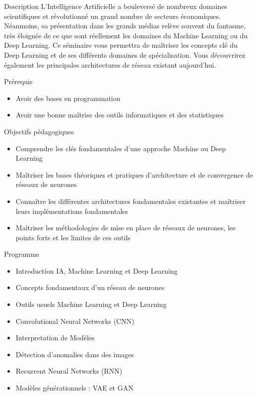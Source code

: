 
\begin{frame}{Description}
  L'Intelligence Artificielle a bouleversé de nombreux domaines scientifiques et révolutionné un grand nombre de secteurs économiques.
  Néanmoins, sa présentation dans les grands médias relève souvent du fantasme, très éloignée de ce que sont réellement les domaines du Machine Learning ou du Deep Learning.
  Ce séminaire vous permettra de maîtriser les concepts clé du Deep Learning et de ses différents domaines de spécialisation.
  Vous découvrirez également les principales architectures de réseau existant aujourd'hui.
\end{frame}

\begin{frame}{Prérequis}
  \begin{itemize}
    \item Avoir des bases en programmation
    \item Avoir une bonne maîtrise des outils informatiques et des statistiques
  \end{itemize}
\end{frame}

\begin{frame}{Objectifs pédagogiques}
  \begin{itemize}
    \item Comprendre les clés fondamentales d'une approche Machine ou Deep Learning
    \item Maîtriser les bases théoriques et pratiques d'architecture et de convergence de réseaux de neurones
    \item Connaître les différentes architectures fondamentales existantes et maîtriser leurs implémentations fondamentales
    \item Maîtriser les méthodologies de mise en place de réseaux de neurones, les points forts et les limites de ces outils
  \end{itemize}
\end{frame}

\begin{frame}{Programme}
  \begin{itemize}
    \item Introduction IA, Machine Learning et Deep Learning
    \item Concepts fondamentaux d'un réseau de neurones
    \item Outils usuels Machine Learning et Deep Learning
    \item Convolutional Neural Networks (CNN)
    \item Interpretation de Modèles
    \item Détection d'anomalies dans des images
    \item Recurrent Neural Networks (RNN)
    \item Modèles générationnels : VAE et GAN
  \end{itemize}
\end{frame}
